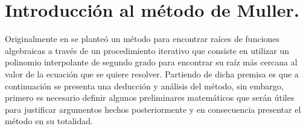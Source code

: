 \section{Introducción al método de Muller.}
Originalmente en \cite{muller1956method} se planteó un método para encontrar raíces de funciones algebraicas
a través de un procedimiento iterativo que consiste en utilizar un polinomio interpolante de segundo 
grado para encontrar su raíz más cercana al valor de la ecuación que se quiere resolver. Partiendo de dicha premisa es que
a continuación se presenta una deducción y análisis del método, sin embargo, primero es necesario definir algunos preliminares
matemáticos que serán útiles para justificar argumentos hechos posteriormente y en consecuencia presentar el método en su totalidad.